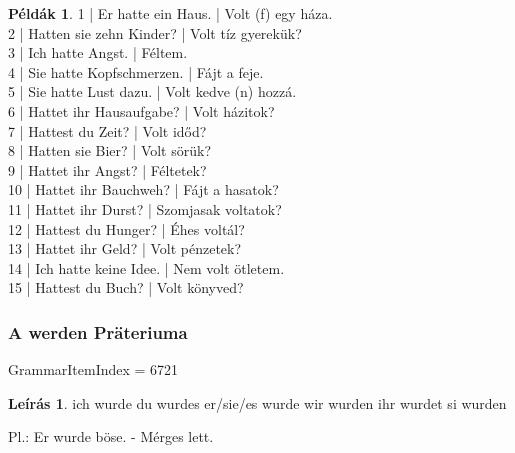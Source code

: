 \documentclass{article}
\theoremstyle{definition}
\newtheorem*{exmp}{Példák}
\newtheorem*{desc}{Leírás}
\begin{document}
\begin{exmp}
1 | Er hatte ein Haus. | Volt (f) egy háza.\\
2 | Hatten sie zehn Kinder? | Volt tíz gyerekük?\\
3 | Ich hatte Angst. | Féltem.\\
4 | Sie hatte Kopfschmerzen. | Fájt a feje.\\
5 | Sie hatte Lust dazu. | Volt kedve (n) hozzá.\\
6 | Hattet ihr Hausaufgabe? | Volt házitok?\\
7 | Hattest du Zeit? | Volt időd?\\
8 | Hatten sie Bier? | Volt sörük?\\
9 | Hattet ihr Angst? | Féltetek?\\
10 | Hattet ihr Bauchweh? | Fájt a hasatok?\\
11 | Hattet ihr Durst? | Szomjasak voltatok?\\
12 | Hattest du Hunger? | Éhes voltál?\\
13 | Hattet ihr Geld? | Volt pénzetek?\\
14 | Ich hatte keine Idee. | Nem volt ötletem.\\
15 | Hattest du Buch? | Volt könyved?\\
\end{exmp}

\subsubsection{A werden Präteriuma}

GrammarItemIndex = 6721

\begin{desc}
ich wurde
du wurdes
er/sie/es wurde
wir wurden
ihr wurdet
si wurden

Pl.: Er wurde böse. - Mérges lett.
\end{desc}
\end{document}

